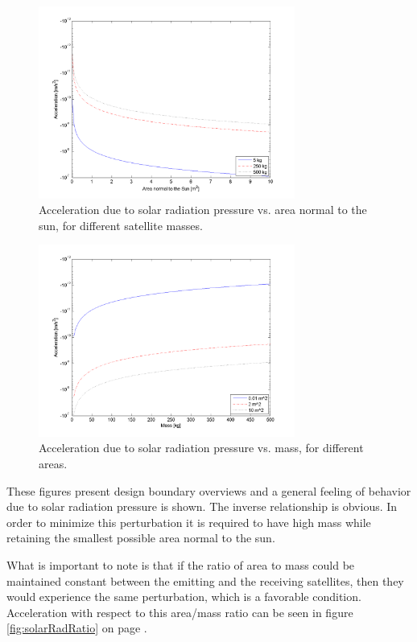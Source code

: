\begin{figure}[ht!]
\centering
\includegraphics[width=0.75\textwidth, angle=0]{chapters/img/solPressureVarArea.png}
\caption{Acceleration due to solar radiation pressure vs. area normal to the sun, for different satellite masses.}
\label{fig:solarRadArea}
\end{figure}

\begin{figure}[ht!]
\centering
\includegraphics[width=0.75\textwidth, angle=0]{chapters/img/solPressureVarMass.png}
\caption{Acceleration due to solar radiation pressure vs. mass, for different areas.}
\label{fig:solarRadMass}
\end{figure}

These figures present design boundary overviews and a general feeling of behavior due to solar radiation pressure is shown. The inverse relationship is obvious. In order to minimize this perturbation it is required to have high mass while retaining the smallest possible area normal to the sun.

What is important to note is that if the ratio of area to mass could be maintained constant between the emitting and the receiving satellites, then they would experience the same perturbation, which is a favorable condition. Acceleration with respect to this area/mass ratio can be seen in figure \ref{fig:solarRadRatio} on page \pageref{fig:solarRadRatio}.

